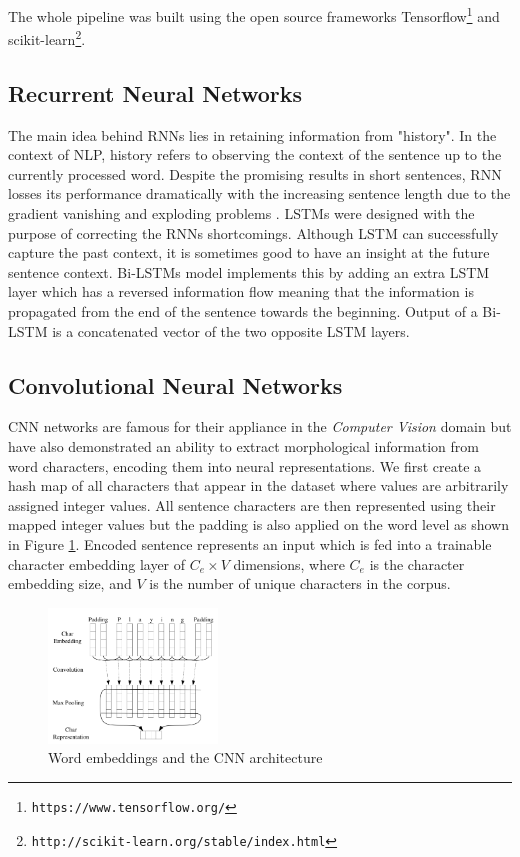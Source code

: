 \documentclass[10pt, a4paper]{article}
\begin{document}
The whole pipeline was built using the open source frameworks
Tensorflow\citep{tensorflow}\footnote{\texttt{https://www.tensorflow.org/}}
and
scikit-learn\citep{scikit}\footnote{\texttt{http://scikit-learn.org/stable/index.html}}.

\subsection{Recurrent Neural Networks}

The main idea behind RNNs lies in retaining information from "history". In the 
context of NLP, history refers to observing the context of the sentence up to the
currently processed word. Despite the promising results in short sentences, RNN
losses its performance dramatically with the increasing sentence length due to 
the gradient vanishing \cite{bengio1994learning} and exploding problems 
\cite{pascanu2013difficulty}. LSTMs were designed with the purpose of correcting 
the RNNs shortcomings. Although LSTM can successfully capture the past context,
it is sometimes good to have an insight at the future sentence context. Bi-LSTMs 
model implements this by adding an extra LSTM layer which has a reversed information flow
meaning that the information is propagated from the end of the sentence towards
the beginning. Output of a Bi-LSTM is a concatenated vector of the two opposite LSTM layers.

\subsection{Convolutional Neural Networks}
CNN networks are famous for their appliance in the \emph{Computer Vision}
domain but have also demonstrated an ability to extract morphological information
from word characters, encoding them into neural representations. We first create
a hash map of all characters that appear in the dataset where values are arbitrarily
assigned integer values. All sentence characters are then represented using their
mapped integer values but the padding is also applied on the word level as shown
in Figure \ref{fig:cnn_embed}. Encoded sentence represents an input which is fed
into a trainable character embedding layer of $C_e \times V$ dimensions, where
$C_e$ is the character embedding size, and $V$ is the number of unique
characters in the corpus.

\begin{figure}
  \caption{Word embeddings and the CNN architecture}
  \label{fig:cnn_embed}
  \centering
    \includegraphics[width=0.4\textwidth]{imgs/cnn_embed.png}
\end{figure}
\end{document}
